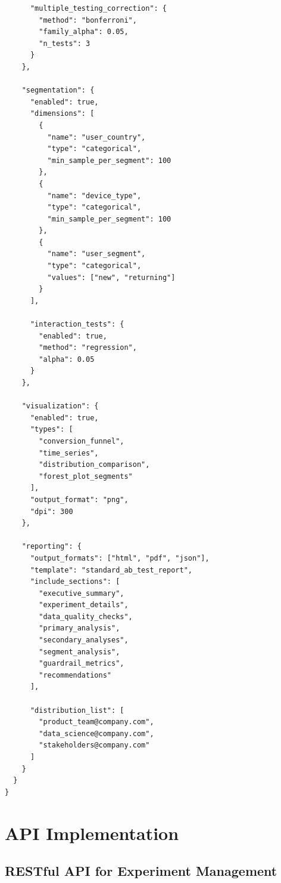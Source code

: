 \begin{lstlisting}
      "multiple_testing_correction": {
        "method": "bonferroni",
        "family_alpha": 0.05,
        "n_tests": 3
      }
    },

    "segmentation": {
      "enabled": true,
      "dimensions": [
        {
          "name": "user_country",
          "type": "categorical",
          "min_sample_per_segment": 100
        },
        {
          "name": "device_type",
          "type": "categorical",
          "min_sample_per_segment": 100
        },
        {
          "name": "user_segment",
          "type": "categorical",
          "values": ["new", "returning"]
        }
      ],

      "interaction_tests": {
        "enabled": true,
        "method": "regression",
        "alpha": 0.05
      }
    },

    "visualization": {
      "enabled": true,
      "types": [
        "conversion_funnel",
        "time_series",
        "distribution_comparison",
        "forest_plot_segments"
      ],
      "output_format": "png",
      "dpi": 300
    },

    "reporting": {
      "output_formats": ["html", "pdf", "json"],
      "template": "standard_ab_test_report",
      "include_sections": [
        "executive_summary",
        "experiment_details",
        "data_quality_checks",
        "primary_analysis",
        "secondary_analyses",
        "segment_analysis",
        "guardrail_metrics",
        "recommendations"
      ],

      "distribution_list": [
        "product_team@company.com",
        "data_science@company.com",
        "stakeholders@company.com"
      ]
    }
  }
}
\end{lstlisting}

\newpage

\section{API Implementation}

\subsection{RESTful API for Experiment Management}

